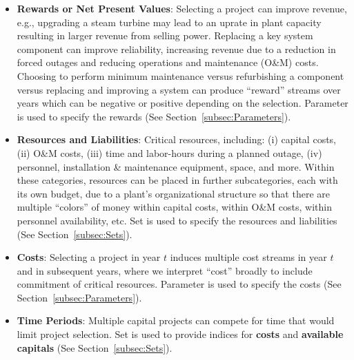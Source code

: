 \begin{itemize}
  \item \textbf{Rewards or Net Present Values}: Selecting a project can improve revenue, e.g.,
  upgrading a steam turbine may lead to an uprate in plant capacity resulting in larger
  revenue from selling power. Replacing a key system component can improve reliability,
  increasing revenue due to a reduction in forced outages and reducing operations and
  maintenance (O\&M) costs. Choosing to perform minimum maintenance versus refurbishing
  a component versus replacing and improving a system can produce “reward” streams over
  years which can be negative or positive depending on the selection. Parameter
   is used to specify the rewards (See Section~\ref{subsec:Parameters}).

  \item \textbf{Resources and Liabilities}: Critical resources, including: (i) capital costs,
  (ii) O\&M costs, (iii) time and labor-hours during a planned outage, (iv) personnel,
  installation \& maintenance equipment, space, and more. Within these categories, resources
  can be placed in further subcategories, each with its own budget, due to a plant’s organizational
  structure so that there are multiple “colors” of money within capital costs, within O\&M costs,
  within personnel availability, etc. Set  is used to specify the resources and
  liabilities (See Section~\ref{subsec:Sets}).

  \item \textbf{Costs}: Selecting a project in year $t$ induces multiple
  cost streams in year $t$ and in subsequent years, where we interpret “cost” broadly to
  include commitment of critical resources. Parameter  is used to specify
  the costs (See Section~\ref{subsec:Parameters}).

  \item \textbf{Time Periods}: Multiple capital projects can compete for time that would
  limit project selection. Set  is used to provide indices for
  \textbf{costs} and \textbf{available capitals} (See Section~\ref{subsec:Sets}).


\end{itemize}
